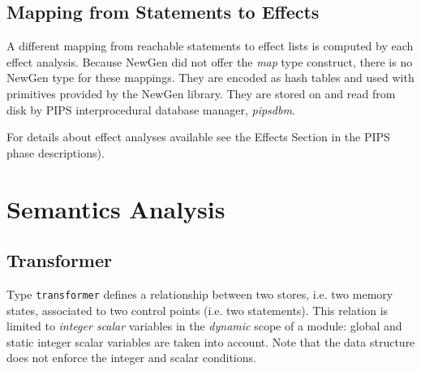 \documentclass[a4paper]{article}
\begin{document}
\begin{comment}
Dans quelques cas particuliers, comme une affectation simple \texttt{I = 2},
l'effet est certain (\emph{must}). Il peut alors �tre utilis� dans
le calcul des \emph{use-def chains} pour effectuer un \emph{kill} sur les
variables scalaires. Un effet \emph{must} sur un tableau ne signifie pas
que tout le tableau est lu ou �crit mais qu'au moins un de ses
�l�ments l'est.
\end{comment}

\subsection{Mapping from Statements to Effects}

A different mapping from reachable statements to effect lists is
computed by each effect analysis. Because NewGen did not offer the 
\emph{map} type construct, there is no NewGen type for these mappings. They
are encoded as hash tables and used with primitives provided by the
NewGen library. They are stored on and read from disk by PIPS
interprocedural database manager, \emph{pipsdbm}.

For details about effect analyses available see the Effects Section in the
PIPS phase descriptions).

\section{Semantics Analysis}
\label{semantics}

\subsection{Transformer}
\label{subsection-transformer}

{}

Type \verb/transformer/ defines a relationship between two stores,
i.e. two memory states, associated to two control points (i.e. two
statements). This relation is limited to \emph{integer scalar} variables
in the \emph{dynamic} scope of a module: global and static integer scalar
variables are taken into account. Note that the data structure does not
enforce the integer and scalar conditions.

\begin{comment}
Le domaine \texttt{transformer} d�finit une relation entre deux �tats
m�moire. Cette relation
porte sur les valeurs des variables scalaires enti�res d'un module ou
des variables globales au programme.
\end{comment}
\end{document}
